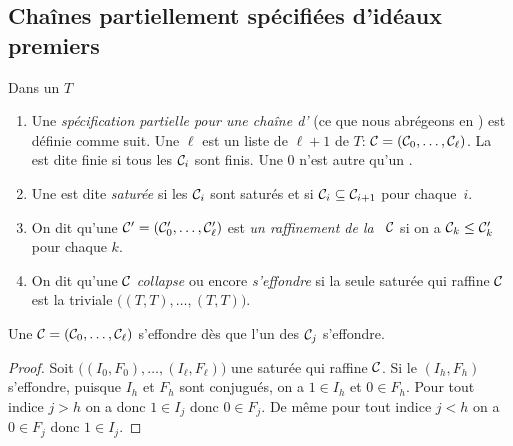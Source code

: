 \subsection{Chaînes partiellement spécifiées d'idéaux
premiers}\label{subsecproctreillis}
\begin{definition}{\rm 
\label{defprochTreil} Dans un \trdi $T$
\begin{enumerate}
\item  Une {\em spécification partielle pour une chaîne
d'\ideps} (ce que nous abrégeons en {\em \proc}) est définie comme
suit. Une \prolo $\ell$ est un liste de $\ell+1$ \prois de $T$:
${\cal C}=({\cal C}_0,\ldots,{\cal C}_\ell)$. La \proc est dite finie si
tous
les ${\cal C}_i$ sont finis. Une \prolo $0$ n'est autre qu'un
{\em \proi}.
\item  Une \proc est dite {\em saturée} si les ${\cal C}_i$ sont saturés
 et si ${\cal C}_i\subseteq {\cal C}_{i+1}$ pour chaque~$i$.
\item  On dit qu'une \proc ${\cal C}'= ({\cal C}'_0,\ldots,{\cal C}'_\ell)$
est
{\em un raffinement de la \proc~${\cal C}$}
si on a ${\cal C}_k\leq  {\cal C}'_k$ pour chaque $k$.
\item  On dit qu'une \proc ${\cal C}$ {\em collapse} ou encore {\em
s'effondre}
si la seule \proc saturée qui raffine ${\cal C}$ est la \proc triviale
$\big((T,T),\ldots,(T,T)\big)$.
\end{enumerate}
}
\end{definition}
\begin{lemma}
\label{lemColTr}
Une \proc ${\cal C}=({\cal C}_0,\dots,{\cal C}_\ell)$  s'effondre dès que l'un des ${\cal C}_j$ s'effondre.
\end{lemma}
\begin{proof}
Soit $\big((I_0,F_0),\ldots,(I_\ell,F_\ell)\big)$ une \proc saturée qui
raffine ${\cal C}$. Si le \proi  $(I_h,F_h)$  s'effondre, puisque  $I_h$  et
$F_h$ sont conjugués, on a $1\in  I_h$ et  $0\in  F_h$.
Pour tout indice $ j>h$  on a donc  $1\in  I_j$ donc   $0\in  F_j$.
De même pour tout indice $ j<h$  on a   $0\in  F_j$  donc
$1\in  I_j$.
\end{proof}



